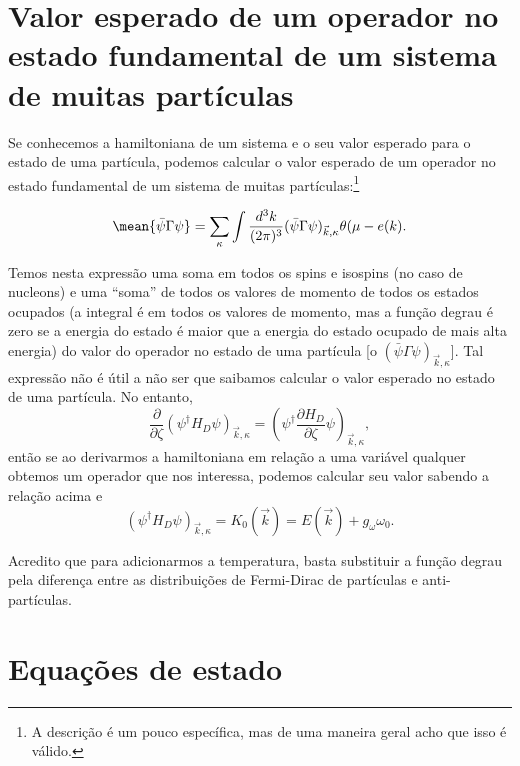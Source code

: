 \section{Valor esperado de um operador no estado fundamental de um sistema de muitas partículas}

Se conhecemos a hamiltoniana de um sistema e o seu valor esperado para o estado de uma partícula, podemos calcular o valor esperado de um operador no estado fundamental de um sistema de muitas partículas\cite{Glendenning}:\footnote{A descrição é um pouco específica, mas de uma maneira geral acho que isso é válido.}

\begin{equation}
	\mean{\bar\psi\Gamma\psi} = \sum_{\kappa} \int \frac{d^3k}{(2\pi)^3} (\bar\psi\Gamma\psi)_{\vec{k},\kappa} \theta(\mu - e(k).
\end{equation}

Temos nesta expressão uma soma em todos os spins e isospins (no caso de nucleons) e uma ``soma'' de todos os valores de momento de todos os estados ocupados (a integral é em todos os valores de momento, mas a função degrau é zero se a energia do estado é maior que a energia do estado ocupado de mais alta energia) do valor do operador no estado de uma partícula [o $(\bar\psi\Gamma\psi)_{\vec{k},\kappa}$]. Tal expressão não é útil a não ser que saibamos calcular o valor esperado no estado de uma partícula. No entanto,
\begin{equation}
	\frac{\partial}{\partial \zeta}(\psi^\dagger H_D\psi)_{\vec{k},\kappa} = (\psi^\dagger \frac{\partial H_D}{\partial \zeta} \psi)_{\vec{k},\kappa},
\end{equation}
%
então se ao derivarmos a hamiltoniana em relação a uma variável qualquer obtemos um operador que nos interessa, podemos calcular seu valor sabendo a relação acima e
\begin{equation}
	(\psi^\dagger H_D\psi)_{\vec{k},\kappa} = K_0(\vec{k}) = E(\vec{k}) + g_\omega \omega_0.
\end{equation}

Acredito que para adicionarmos a temperatura, basta substituir a função degrau pela diferença entre as distribuições de Fermi-Dirac de partículas e anti-partículas.

\section{Equações de estado}

